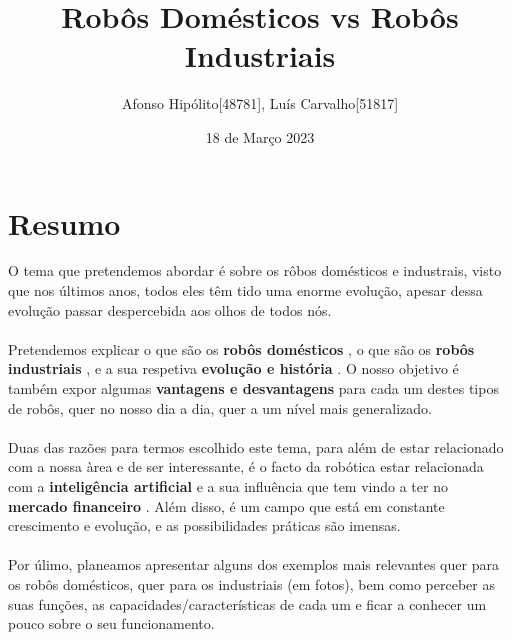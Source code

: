 \documentclass{article}
\title{Robôs Domésticos vs Robôs Industriais}
\author{Afonso Hipólito[48781], Luís Carvalho[51817]}
\date{18 de Março  2023}
\begin{document}
\maketitle

\section{Resumo}
O tema que pretendemos abordar é sobre os rôbos domésticos e industrais, visto que nos últimos anos, todos eles têm tido uma enorme evolução, apesar dessa evolução passar despercebida aos olhos de todos nós.
\\
\\
Pretendemos explicar o que são os \textbf{robôs domésticos} \cite{whatare}\cite{DomesticRobots}, o que são os \textbf{robôs industriais} \cite{robotnik_2022}, e a sua respetiva \textbf{evolução e história} \cite{wevolver}\cite{history}. O nosso objetivo é também expor algumas \textbf{vantagens   e desvantagens} \cite{advantages}\cite{stevens_2022} para cada um destes tipos de robôs, quer no nosso dia a dia, quer a um nível mais generalizado.
\\
\\
Duas das razões para termos escolhido este tema, para além de estar relacionado com a nossa àrea e de ser interessante, é o facto da robótica estar relacionada com a \textbf{inteligência artificial} \cite{martin_2022}\cite{helfrich_2022} e a sua influência que tem vindo a ter no \textbf{mercado financeiro} \cite{market}. Além disso, é um campo que está em constante crescimento e evolução, e as possibilidades práticas são imensas.
\\
\\
Por úlimo, planeamos apresentar alguns dos exemplos mais relevantes quer para os robôs domésticos, quer para os industriais (em fotos), bem como perceber as suas funções, as capacidades/características de cada um e ficar a conhecer um pouco sobre o seu funcionamento.


\printbibliography[title=Referências]
\end{document}
